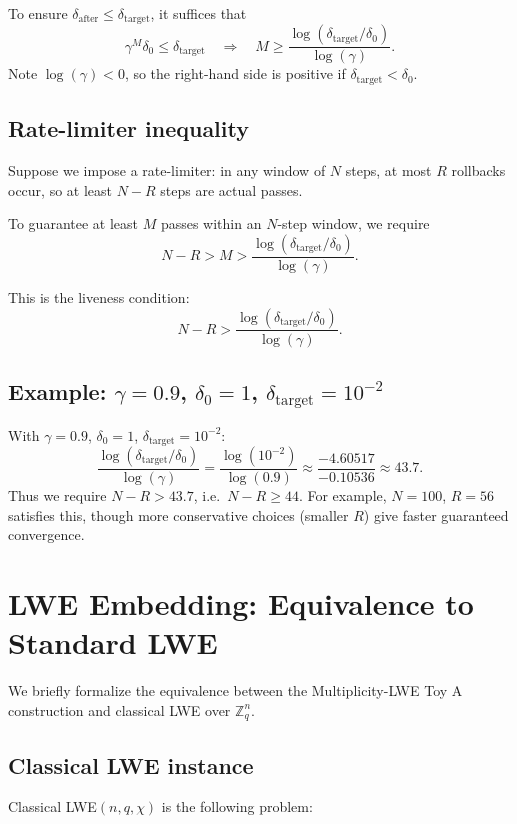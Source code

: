 \documentclass[11pt]{article}
\begin{document}
To ensure $\delta_{\mathrm{after}} \le \delta_{\mathrm{target}}$, it suffices
that
\[
\gamma^M \delta_0 \le \delta_{\mathrm{target}}
\quad\Rightarrow\quad
M \ge \frac{\log(\delta_{\mathrm{target}}/\delta_0)}{\log(\gamma)}.
\]
Note $\log(\gamma)<0$, so the right-hand side is positive if
$\delta_{\mathrm{target}}<\delta_0$.

\subsection{Rate-limiter inequality}

Suppose we impose a rate-limiter: in any window of $N$ steps, at most $R$
rollbacks occur, so at least $N-R$ steps are actual passes.

To guarantee at least $M$ passes within an $N$-step window, we require
\[
N - R > M
> \frac{\log(\delta_{\mathrm{target}}/\delta_0)}{\log(\gamma)}.
\]

This is the liveness condition:
\[
N - R > \frac{\log(\delta_{\mathrm{target}}/\delta_0)}{\log(\gamma)}.
\]

\subsection{Example: $\gamma=0.9$, $\delta_0=1$, $\delta_{\mathrm{target}}=10^{-2}$}

With $\gamma=0.9$, $\delta_0=1$, $\delta_{\mathrm{target}}=10^{-2}$:
\[
\frac{\log(\delta_{\mathrm{target}}/\delta_0)}{\log(\gamma)}
= \frac{\log(10^{-2})}{\log(0.9)}
\approx \frac{-4.60517}{-0.10536} \approx 43.7.
\]
Thus we require $N-R > 43.7$, i.e.\ $N-R\ge 44$. For example, $N=100$, $R=56$
satisfies this, though more conservative choices (smaller $R$) give faster
guaranteed convergence.

\section{LWE Embedding: Equivalence to Standard LWE}

We briefly formalize the equivalence between the Multiplicity-LWE Toy A
construction and classical LWE over $\mathbb{Z}_q^n$.

\subsection{Classical LWE instance}

Classical LWE$(n,q,\chi)$ is the following problem:\cite{pqc-lwe}
\end{document}
